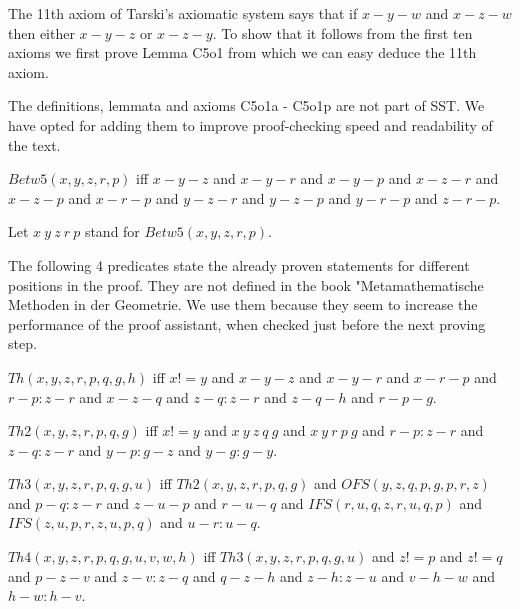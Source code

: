 \documentclass{article}
\begin{document}
  The 11th axiom of Tarski's axiomatic system says that if $x-y-w$ and $x-z-w$ then either $x-y-z$ or $x-z-y$. To show that it follows from the first ten axioms we first prove Lemma C5o1 from which we can easy deduce the 11th axiom.

  The definitions, lemmata and axioms C5o1a - C5o1p are not part of SST. We have opted for adding them to improve proof-checking speed and readability of the text.

  \begin{forthel}
    \begin{definition}[C5o1a]
      $Betw5(x,y,z,r,p)$ iff $x-y-z$ and $x-y-r$ and $x-y-p$ and $x-z-r$ and $x-z-p$ and $x-r-p$ and $y-z-r$ and $y-z-p$ and $y-r-p$ and $z-r-p$.
    \end{definition}

    Let $x~y~z~r~p$ stand for $Betw5(x,y,z,r,p)$.
  \end{forthel}

  The following 4 predicates state the already proven statements for different positions in the proof. They are not defined in the book "Metamathematische Methoden in der Geometrie. We use them because they seem to increase the performance of the proof assistant, when checked just before the next proving step.

  \begin{forthel}
    \begin{definition}[C5o1b]
      $Th(x,y,z,r,p,q,g,h)$ iff $x != y$ and $x-y-z$ and $x-y-r$ and $x-r-p$ and $r-p : z-r$ and $x-z-q$ and $z-q : z-r$ and $z-q-h$ and $r-p-g$.
    \end{definition}

    \begin{definition}[C5o1c]
      $Th2(x,y,z,r,p,q,g)$ iff $x != y$ and $x~y~z~q~g$ and $x~y~r~p~g$ and $r-p : z-r$ and $z-q : z-r$ and $y-p : g-z$ and $y-g : g-y$.
    \end{definition}

    \begin{definition}[C5o1d]
      $Th3(x,y,z,r,p,q,g,u)$ iff $Th2(x,y,z,r,p,q,g)$ and $OFS(y,z,q,p,g,p,r,z)$ and $p-q : z-r$ and $z-u-p$ and $r-u-q$ and $IFS(r,u,q,z,r,u,q,p)$ and $IFS(z,u,p,r,z,u,p,q)$ and $u-r : u-q$.
    \end{definition}

    \begin{definition}[C5o1e]
      $Th4(x,y,z,r,p,q,g,u,v,w,h)$ iff $Th3(x,y,z,r,p,q,g,u)$ and $z != p$ and $z != q$ and $p-z-v$ and $z-v : z-q$ and $q-z-h$ and $z-h : z-u$ and $v-h-w$ and $h-w : h-v$.
    \end{definition}
  \end{forthel}
\end{document}
